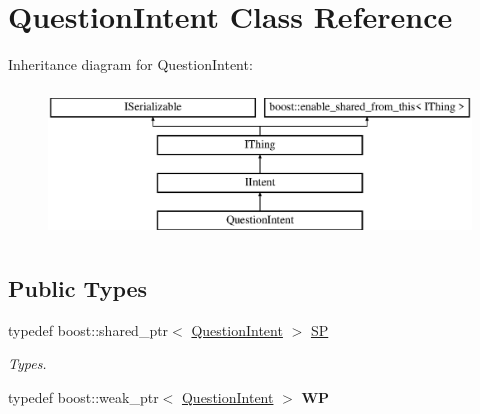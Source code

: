 \hypertarget{class_question_intent}{}\section{Question\+Intent Class Reference}
\label{class_question_intent}
Inheritance diagram for Question\+Intent\+:\begin{figure}[H]
\begin{center}
\leavevmode
\includegraphics[height=4.000000cm]{class_question_intent}
\end{center}
\end{figure}
\subsection*{Public Types}
\begin{DoxyCompactItemize}
\item 
\mbox{\label{class_question_intent_a250dceb08e1342574a0aca4fe40a7121}} 
typedef boost\+::shared\+\_\+ptr$<$ \hyperlink{class_question_intent}{Question\+Intent} $>$ \hyperlink{class_question_intent_a250dceb08e1342574a0aca4fe40a7121}{SP}
\begin{DoxyCompactList}\small\item\em Types. \end{DoxyCompactList}\item 
\mbox{\label{class_question_intent_a5292e951bfe77682c97c42ef4da2bae9}} 
typedef boost\+::weak\+\_\+ptr$<$ \hyperlink{class_question_intent}{Question\+Intent} $>$ {\bfseries WP}
\end{DoxyCompactItemize}
